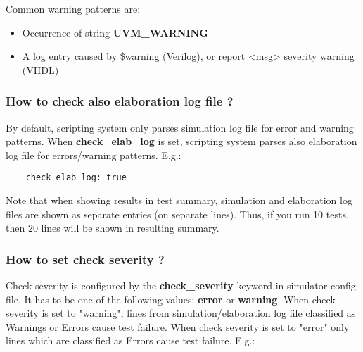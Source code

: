 \documentclass{tropic_design_spec}
\begin{document}
Common warning patterns are:
\begin{itemize}
    \item {Occurrence of string \textbf{UVM_WARNING}}
    \item {A log entry caused by \$warning (Verilog), or report <msg> severity warning (VHDL)}
\end{itemize}



\subsubsection{How to check also elaboration log file ?}
\label{sec:how-to-check-also-elaboration-log}

By default, scripting system only parses simulation log file for error and warning patterns.
When \textbf{check_elab_log} is set, scripting system parses also elaboration log file
for errors/warning patterns. E.g.:

\begin{lstlisting}
    check_elab_log: true
\end{lstlisting}    

Note that when showing results in test summary, simulation and elaboration log files are
shown as separate entries (on separate lines). Thus, if you run 10 tests, then 20 lines
will be shown in resulting summary.


\subsubsection{How to set check severity ?}
\label{sec:how-to-set-check-severity}

Check severity is configured by the \textbf{check_severity} keyword in simulator config file.
It has to be one of the following values: \textbf{error} or \textbf{warning}. When check
severity is set to "warning", lines from simulation/elaboration log file classified as Warnings or
Errors cause test failure. When check severity is set to "error" only lines which are
classified as Errors cause test failure. E.g.:
\end{document}

